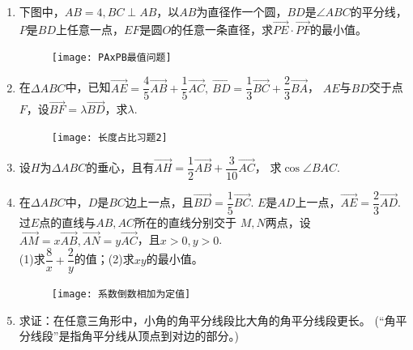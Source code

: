 \begin{enumerate}[label={\textbf{\arabic*.}},leftmargin=
    \inteval{\myenumleftmargin}pt]
\item 下图中，$ AB=4,BC \perp AB $，以$ AB $为直径作一个圆，$ BD $是$ \angle ABC $的平分线，$ P $是$ BD $上任意一点，$ EF $是圆$ O $的任意一条直径，求$ \vec{PE}\cdot \vec{PF} $的最小值。
\begin{figure}[h]
    \centering
    \texttt{[image: PAxPB最值问题]}
\end{figure}

\item 在$ \Delta ABC $中，已知$ \vec{AE}=\dfrac{4}{5}
\vec{AB}+\dfrac{1}{5}\vec{AC},\ \vec{BD}=
\dfrac{1}{3}\vec{BC}+\dfrac{2}{3}\vec{BA} $，
$ AE $与$ BD $交于点$ F $，设$ \vec{BF}=\lambda 
\vec{BD} $，求$ \lambda $. 
\begin{figure}[h]
    \centering
    \texttt{[image: 长度占比习题2]}
\end{figure}

\item 设$ H $为$ \Delta ABC $的垂心，且有$ \vec{AH}=
\dfrac{1}{2}\vec{AB}+\dfrac{3}{10}\vec{AC} $，
求$ \cos \angle BAC $. 

\item 在$ \Delta ABC $中，$ D $是$ BC $边上一点，且$ \vec{BD}=
\dfrac{1}{5}\vec{BC} $. $ E $是$ AD $上一点，$ \vec{AE} =
\dfrac{2}{3}\vec{AD} $. 过$ E $点的直线与$ AB,AC $所在的直线分别交于
$ M,N $两点，设$ \vec{AM}=x\vec{AB},\vec{AN}=
y\vec{AC} $，且$ x>0,y>0 $. \\
(1)求$ \dfrac{8}{x}+\dfrac{2}{y} $的值；(2)求$ xy $的最小值。
\begin{figure}[!htbp]
    \centering
    \texttt{[image: 系数倒数相加为定值]}
\end{figure} 

\item 求证：在任意三角形中，小角的角平分线段比大角的角平分线段更长。
(“角平分线段”是指角平分线从顶点到对边的部分。)

\end{enumerate}

